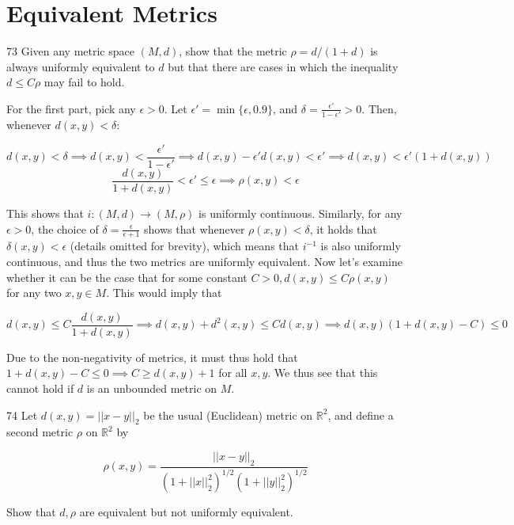 \section{Equivalent Metrics}

\begin{exercise}{73}
    Given any metric space $(M, d)$, show that the metric $\rho = d/(1 + d)$ is always uniformly equivalent to $d$ but that there are cases in which the inequality $d \leq C \rho$ may fail to hold.
\end{exercise}

\begin{solution}
    
    For the first part, pick any $\epsilon > 0$.
    Let $\epsilon' = \min\{\epsilon, 0.9\}$, and $\delta = \frac{\epsilon'}{1 - \epsilon'} > 0$.
    Then, whenever $d(x, y) < \delta$:

    \[d(x, y) < \delta \implies d(x, y) < \frac{\epsilon'}{1 - \epsilon'} \implies d(x, y) - \epsilon' d(x, y) < \epsilon' \implies d(x, y) < \epsilon'(1 + d(x, y))\]
    \[\frac{d(x, y)}{1 + d(x, y)} < \epsilon' \leq \epsilon \implies \rho(x, y) < \epsilon\]

    This shows that $i: (M, d) \rightarrow (M, \rho)$ is uniformly continuous.
    Similarly, for any $\epsilon > 0$, the choice of $\delta = \frac{\epsilon}{\epsilon + 1}$ shows that whenever $\rho(x, y) < \delta$, it holds that $\delta(x, y) < \epsilon$ (details omitted for brevity), which means that $i^{-1}$ is also uniformly continuous, and thus the two metrics are uniformly equivalent.
    Now let's examine whether it can be the case that for some constant $C > 0, d(x, y) \leq C\rho(x, y)$ for any two $x, y \in M$.
    This would imply that

    \[d(x, y) \leq C\frac{d(x, y)}{1 + d(x, y)} \implies d(x, y) + d^2(x, y) \leq Cd(x, y) \implies d(x, y)(1 + d(x, y) - C) \leq 0\]

    Due to the non-negativity of metrics, it must thus hold that $1 + d(x, y) - C \leq 0 \implies C \geq d(x, y) + 1$ for all $x, y$.
    We thus see that this cannot hold if $d$ is an unbounded metric on $M$.
\end{solution}

\begin{exercise}{74}
    Let $d(x, y) = \lvert \lvert x - y \rvert \rvert_2$ be the usual (Euclidean) metric on $\mathbb{R}^2$, and define a second metric $\rho$ on $\mathbb{R}^2$ by

    \[\rho(x, y) = \frac{\lvert \lvert x - y \rvert \rvert_2}{(1 + \lvert \lvert x \rvert \rvert_2^2)^{1/2}(1 + \lvert \lvert y \rvert \rvert_2^2)^{1/2}}\]

    Show that $d, \rho$ are equivalent but not uniformly equivalent.
\end{exercise}

